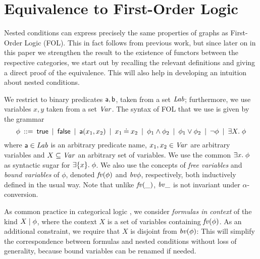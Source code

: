 \section{Equivalence to First-Order Logic}

Nested conditions can express precisely the same properties of graphs as First-Order Logic (FOL). This in fact follows from previous work, but since later on in this paper we strengthen the result to the existence of functors between the respective categories, we start out by recalling the relevant definitions and giving a direct proof of the equivalence. This will also help in developing an intuition about nested conditions.

We restrict to binary predicates $\mathsf{a},\mathsf{b}$, taken from a set $\mathit{Lab}$; furthermore, we use variables $x,y$ taken from a set $\mathit{Var}$. The syntax of FOL that we use is given by the grammar
%
\[ \phi \:::=\: \mathsf{true}
        \:\mid\: \mathsf{false}
		\:\mid\: \mathsf{a}(x_1,x_2)
        \:\mid\: x_1\mathbin{\doteq} x_2
		\:\mid\: \phi_1\wedge \phi_2
		\:\mid\: \phi_1\vee \phi_2
		\:\mid\: \neg\phi
		\:\mid\: \exists X.\; \phi 
		\]
where $\mathsf{a}\in\mathit{Lab}$ is an arbitrary predicate name, $x_1,x_2\in\mathit{Var}$ are arbitrary variables and $X\subseteq \mathit{Var}$ an arbitrary set of variables. We use the common $\exists x.\; \phi$ as syntactic sugar for $\exists\{{x}\}.\; \phi$. We also use the concepts of \emph{free variables} and \emph{bound variables} of $\phi$, denoted $\mathit{fv}(\phi)$ and $\mathit{bv}{\phi}$, respectively, both inductively defined in the usual way. Note that unlike  $\mathit{fv}(\_)$, $\mathit{bv}{\_}$ is not invariant under $\alpha$-conversion.


As common practice in categorical logic \cite{JacobsBook}, we consider \emph{formulas in context} of the kind ${X} \mid {\phi}$, where the context $X$ is a set of variables containing $\mathit{fv}(\phi)$. As an additional constraint, we require that $X$ is disjoint from $\mathit{bv}(\phi)$: This will simplify the correspondence between formulas and nested conditions without loss of generality, because bound variables can be renamed if needed.

